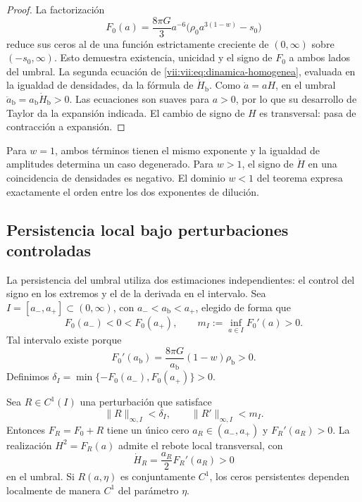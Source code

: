 \begin{proof}
La factorización
\[
 F_0(a)=\frac{8\pi G}{3}a^{-6}
             \bigl(\rho_0a^{3(1-w)}-s_0\bigr)
\]
reduce sus ceros al de una función estrictamente creciente de
\((0,\infty)\) sobre \((-s_0,\infty)\). Esto demuestra existencia,
unicidad y el signo de \(F_0\) a ambos lados del umbral.
La segunda ecuación de \eqref{vii:vii:eq:dinamica-homogenea}, evaluada
en la igualdad de densidades, da la fórmula de \(\dot H_{\mathrm b}\).
Como \(\dot a=aH\), en el umbral
\(\ddot a_{\mathrm b}=a_{\mathrm b}\dot H_{\mathrm b}>0\).
Las ecuaciones son suaves para \(a>0\), por lo que su desarrollo de
Taylor da la expansión indicada. El cambio de signo de \(H\) es
transversal: pasa de contracción a expansión.
\end{proof}

Para \(w=1\), ambos términos tienen el mismo exponente y la igualdad de
amplitudes determina un caso degenerado. Para \(w>1\), el signo de
\(\dot H\) en una coincidencia de densidades es negativo.
El dominio \(w<1\) del teorema expresa exactamente el orden entre los
dos exponentes de dilución.

\subsection{Persistencia local bajo perturbaciones controladas}
\label{vii:vii:sec:persistencia}

La persistencia del umbral utiliza dos estimaciones independientes:
el control del signo en los extremos y el de la derivada en el
intervalo. Sea \(I=[a_-,a_+]\subset(0,\infty)\), con
\(a_-<a_{\mathrm b}<a_+\), elegido de forma que
\[
 F_0(a_-)<0<F_0(a_+),\qquad
 m_I:=\inf_{a\in I}F_0'(a)>0.
\]
Tal intervalo existe porque
\[
 F_0'(a_{\mathrm b})
   =\frac{8\pi G}{a_{\mathrm b}}(1-w)\rho_{\mathrm b}>0.
\]
Definimos
\(\delta_I=\min\{-F_0(a_-),F_0(a_+)\}>0\).

\begin{theorem}
\label{vii:vii:thm:persistencia}
Sea \(R\in C^1(I)\) una perturbación que satisface
\[
 \|R\|_{\infty,I}<\delta_I,\qquad
 \|R'\|_{\infty,I}<m_I.
\]
Entonces \(F_R=F_0+R\) tiene un único cero \(a_R\in(a_-,a_+)\) y
\(F_R'(a_R)>0\). La realización \(H^2=F_R(a)\) admite el rebote local
transversal, con
\[
 \dot H_R=\frac{a_R}{2}F_R'(a_R)>0
\]
en el umbral. Si \(R(a,\eta)\) es conjuntamente \(C^1\), los ceros
persistentes dependen localmente de manera \(C^1\) del parámetro \(\eta\).
\end{theorem}

